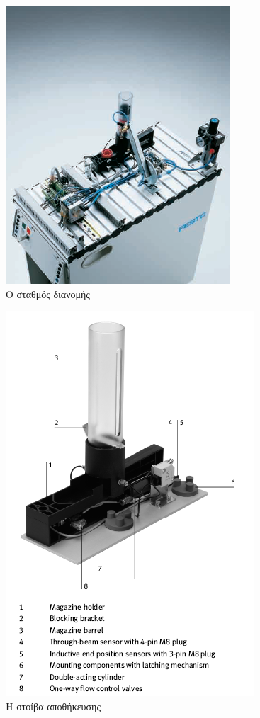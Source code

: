 \documentclass[a4paper,12pt,twoside]{report}
\begin{document}
{				\begin{figure}[hp]
					\centering
					\includegraphics[scale=0.25]{DistributionStationFesto.png}
					\caption{Ο σταθμός διανομής \cite{OverviewMPSStations}}
					\label{φωτ:Ο σταθμός διανομής από Festo}
				\end{figure}
				
				\begin{figure}[hp]
					\centering
					\includegraphics[scale=0.75]{StackModuleParts.png}
					\caption{Η στοίβα αποθήκευσης \cite{FestoStackMagazineModuleManual}}
					\label{φωτ:Η στοίβα αποθήκευσης από Festo}
				\end{figure}
				
}
\end{document}
